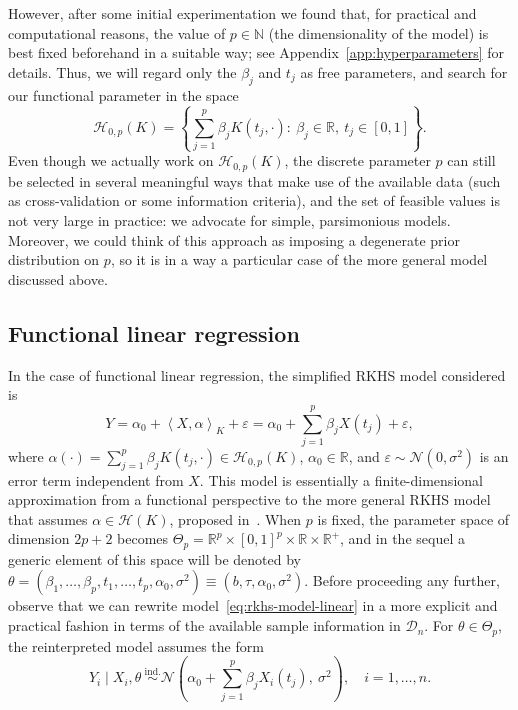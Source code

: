 \documentclass{article}
\numberwithin{equation}{section}
\theoremstyle{plain}
\renewcommand{\epsilon}{\varepsilon}
\newcommand{\N}{\mathbb{N}}
\newcommand{\R}{\mathbb{R}}
\newcommand{\Hcal}{\mathcal{H}}
\newcommand\dotprod[2]{\left\langle#1,#2\right\rangle}
\begin{document}
However, after some initial experimentation we found that, for practical and computational reasons, the value of \(p\in \N\) (the dimensionality of the model) is best fixed beforehand in a suitable way; see Appendix~\ref{app:hyperparameters} for details. Thus, we will regard only the \(\beta_j\) and \(t_j\) as free parameters, and search for our functional parameter in the space
\begin{equation}\label{eq:h0p}
  \Hcal_{0,p}(K)=\left\{ \sum_{j=1}^p \beta_j K(t_j, \cdot): \ \beta_j \in \R, \ t_j \in [0, 1]\right\}.
\end{equation}
Even though we actually work on \(\Hcal_{0,p}(K)\), the discrete parameter \(p\) can still be selected in several meaningful ways that make use of the available data (such as cross-validation or some information criteria), and the set of feasible values is not very large in practice: we advocate for simple, parsimonious models. Moreover, we could think of this approach as imposing a degenerate prior distribution on \(p\), so it is in a way a particular case of the more general model discussed above.

\subsection{Functional linear regression}\label{sec:rkhs-linear-model}

In the case of functional linear regression, the simplified RKHS model considered is
\begin{equation}\label{eq:rkhs-model-linear}
  Y = \alpha_0 + \dotprod{X}{\alpha}_K + \epsilon = \alpha_0 + \sum_{j=1}^p \beta_j X(t_j) + \epsilon,
\end{equation}
where \(\alpha(\cdot)=\sum_{j=1}^p\beta_j K(t_j, \cdot) \in \Hcal_{0,p}(K)\), \(\alpha_0\in\R\), and \(\epsilon \sim \mathcal N(0,\sigma^2)\) is an error term independent from \(X\). This model is essentially a finite-dimensional approximation from a functional perspective to the more general RKHS model that assumes \(\alpha \in \Hcal(K)\), proposed in~\citet{berrendero2019rkhs}. When \(p\) is fixed, the parameter space of dimension \(2p + 2\) becomes \(\Theta_p = \R^p \times [0, 1]^p \times \R \times \R^+\), and in the sequel a generic element of this space will be denoted by \(\theta = (\beta_1,\dots, \beta_p, t_1,\dots, t_p, \alpha_0, \sigma^2) \equiv (b, \tau, \alpha_0, \sigma^2)\). Before proceeding any further, observe that we can rewrite model~\eqref{eq:rkhs-model-linear} in a more explicit and practical fashion in terms of the available sample information in \(\mathcal D_n\). For \(\theta \in \Theta_p\), the reinterpreted model assumes the form
\begin{equation}\label{eq:rkhs-model-linear-2}
  Y_i \mid X_i, \theta \ \stackrel{\text{ind.}}{\sim} \mathcal N\left(\alpha_0 + \sum_{j=1}^p \beta_j X_i(t_j), \ \sigma^2\right), \quad i =1,\dots, n.
\end{equation}
\end{document}
